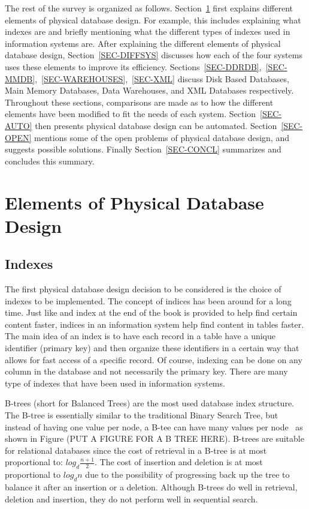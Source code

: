 \documentclass[12pt,a4paper]{article}
\begin{document}
The rest of the survey is organized as follows. Section~\ref{SEC-ELEMENTS} first explains different elements of physical database design. For example, this
includes explaining what indexes are and briefly mentioning what the different types of indexes used in information systems are. After explaining the different
elements of physical database design, Section~\ref{SEC-DIFFSYS} discusses how each of the four systems uses these elements to improve its efficiency.
Sections~\ref{SEC-DDRDB},~\ref{SEC-MMDB},~\ref{SEC-WAREHOUSES},~\ref{SEC-XML} discuss Disk Based Databases, Main Memory Databases, Data Warehouses, and XML
Databases respectively. Throughout these sections, comparisons are made as to how the different elements have been modified to fit the needs of each system.
Section~\ref{SEC-AUTO} then presents physical database design can be automated. Section~\ref{SEC-OPEN} mentions some of the open problems of physical database
design, and suggests possible solutions. Finally Section~\ref{SEC-CONCL} summarizes and concludes this summary.



\section{Elements of Physical Database Design}
\label{SEC-ELEMENTS}

\subsection{Indexes}

The first physical database design decision to be considered is the choice of indexes to be implemented. The concept of indices has been around for a long time.
Just like and index at the end of the book is provided to help find certain content faster, indices in an information system help find content in tables faster.
The main idea of an index is to have each record in a table have a unique identifier (primary key) and then organize these identifiers in a certain way that
allows for fast access of a specific record. Of course, indexing can be done on any column in the database and not necessarily the primary key. There are many
type of indexes that have been used in information systems.

B-trees (short for Balanced Trees) are the most used database index structure.  The B-tree is essentially similar to the traditional Binary Search Tree, but
instead of having one value per node, a B-tee can have many values per node~\cite{comer1979ubiquitous} as shown in Figure (PUT A FIGURE FOR A B TREE HERE).
B-trees are suitable for relational databases since the cost of retrieval in a B-tree is at most proportional to: $log_{d}\frac{n+1}{2}$. The cost of insertion
and deletion is at most proportional to $log_{d}n$ due to the possibility of progressing back up the tree to balance it after an insertion or a deletion.
Although B-trees do well in retrieval, deletion and insertion, they do not perform well in sequential search. 
\end{document}
